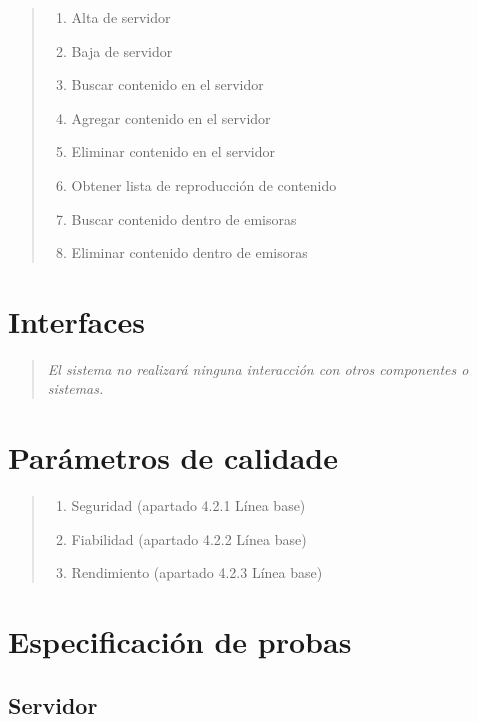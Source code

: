 \documentclass[DIV=calc,paper=a4,fontsize=11pt,onecolumn]{scrartcl}	 %
\newcommand{\hint}[1]{\begin{quote}\itshape #1 \end{quote}}
\begin{document}
\hint{
		\begin{enumerate}
			\item Alta de servidor
			\item Baja de servidor
			\item Buscar contenido en el servidor
			\item Agregar contenido en el servidor			
			\item Eliminar contenido en el servidor			
			\item Obtener lista de reproducción de contenido
			\item Buscar contenido dentro de emisoras
			\item Eliminar contenido dentro de emisoras
		\end{enumerate}
	}

\section{Interfaces}

\hint{El sistema no realizará ninguna interacción con otros componentes o sistemas.}

\section{Parámetros de calidade}

\hint{
	\begin{enumerate}
		\item Seguridad (apartado 4.2.1 Línea base)
		\item Fiabilidad (apartado 4.2.2 Línea base)
		\item Rendimiento (apartado 4.2.3 Línea base)
	\end{enumerate}
	}

\section{Especificación de probas}

\subsection{Servidor}
\end{document}
